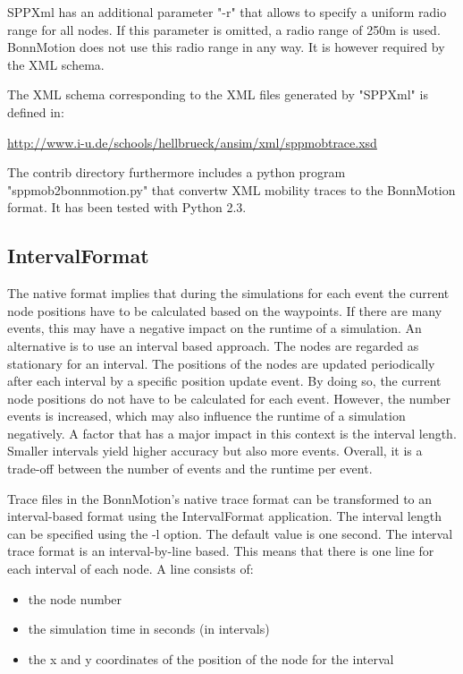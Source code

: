 \documentclass[11pt,a4paper,twoside,normalheadings,headsepline,DIV13,BCOR11mm,openright]{article}
\begin{document}
SPPXml has an additional parameter "-r" that allows to specify a uniform
radio  range  for all nodes. If this parameter is omitted, a radio range
of 250m is used. BonnMotion does not use this radio range in any way. It
is however required by the XML schema.

The  XML  schema corresponding to the XML files generated by "SPPXml" is
defined in:

\url{http://www.i-u.de/schools/hellbrueck/ansim/xml/sppmobtrace.xsd}

The  contrib   directory   furthermore   includes   a   python   program
"sppmob2bonnmotion.py"   that   convertw  XML  mobility  traces  to  the
BonnMotion format. It has been tested with Python 2.3.


\subsection{IntervalFormat}

The native format implies that during the simulations for each event
the current node positions have to be calculated based on the
waypoints.  If there are many events, this may have a negative impact
on the runtime of a simulation. An alternative is to use an interval
based approach. The nodes are regarded as stationary for an
interval. The positions of the nodes are updated periodically after
each interval by a specific position update event. By doing so, the
current node positions do not have to be calculated for each
event. However, the number events is increased, which may also
influence the runtime of a simulation negatively. A factor that has a
major impact in this context is the interval length. Smaller intervals
yield higher accuracy but also more events. Overall, it is a trade-off
between the number of events and the runtime per event.

Trace files in the BonnMotion's native trace format can be transformed
to an interval-based format using the IntervalFormat application. The
interval length can be specified using the -l option. The default
value is one second. The interval trace format is an interval-by-line
based. This means that there is one line for each interval of each
node. A line consists of: 
\begin{itemize}
\item the node number
\item the simulation time in seconds (in intervals) 
\item the x and y coordinates of the position of the node for the interval 
\end{itemize}
\end{document}
